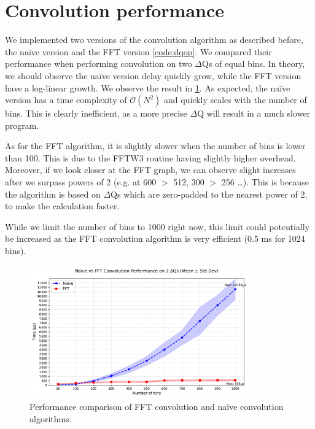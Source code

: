\section{Convolution performance}
    We implemented two versions of the convolution algorithm as described before, the naïve version and the FFT version \ref{code:dqop}. We compared their performance when performing convolution on two $\Delta$Qs of equal bins. In theory, we should observe the naïve version delay quickly grow, while the FFT version have a log-linear growth. We observe the result in \cref{fig:conv_perf}.
    As expected, the naïve version has a time complexity of $\mathcal{O}(N^2)$ and quickly scales with the number of bins. This is clearly inefficient, as a more precise $\Delta$Q will result in a much slower program.

As for the FFT algorithm, it is slightly slower when the number of bins is lower than 100. This is due to the FFTW3 routine having slightly higher overhead. Moreover, if we look closer at the FFT graph, we can observe slight increases after we surpass powers of 2 (e.g. at 600 $>$ 512, 300 $>$ 256 \dots). This is because the algorithm is based on $\Delta$Qs which are zero-padded to the nearest power of 2, to make the calculation faster.

While we limit the number of bins to 1000 right now, this limit could potentially be increased as the FFT convolution algorithm is very efficient (0.5 ms for 1024 bins).

    \begin{figure}[H]
        \begin{center}
            \includegraphics[width=0.85\textwidth]{img/conv_perf.pdf}
        \end{center}
        \caption{Performance comparison of FFT convolution and naïve convolution algorithms.}
        \label{fig:conv_perf}
    \end{figure}


